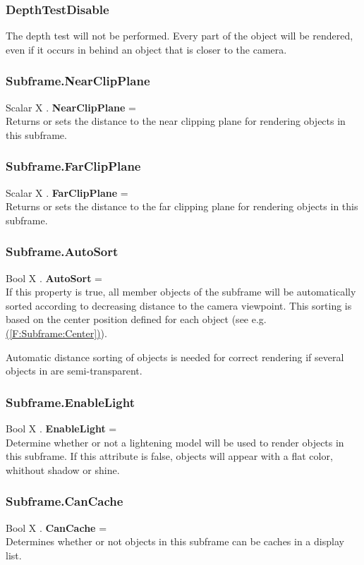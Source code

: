 \documentclass[10pt]{book}
\newcommand{\linkitem}[1]{\hyperref[#1]{\nameref{#1} (\ref{#1})}}
\begin{document}
\subsubsection{DepthTestDisable \label{T:DepthTest|DepthTestDisable}}
The depth test will not be performed. Every part of the object will be rendered, even if it occurs in behind an object that is closer to the camera.

\subsubsection{Subframe.NearClipPlane \label{F:Subframe:NearClipPlane}}
Scalar X . \textbf{NearClipPlane} = \\
Returns or sets the distance to the near clipping plane for rendering objects in this subframe.

\subsubsection{Subframe.FarClipPlane \label{F:Subframe:FarClipPlane}}
Scalar X . \textbf{FarClipPlane} = \\
Returns or sets the distance to the far clipping plane for rendering objects in this subframe.

\subsubsection{Subframe.AutoSort \label{F:Subframe:AutoSort}}
Bool X . \textbf{AutoSort} = \\
If this property is true, all member objects of the subframe will be automatically sorted according to decreasing distance to the camera viewpoint. This sorting is based on the center position defined for each object (see e.g. \linkitem{F:Subframe:Center}).

Automatic distance sorting of objects is needed for correct rendering if several objects in are semi-transparent.

\subsubsection{Subframe.EnableLight \label{F:Subframe:EnableLight}}
Bool X . \textbf{EnableLight} = \\
Determine whether or not a lightening model will be used to render objects in this subframe. If this attribute is false, objects will appear with a flat color, whithout shadow or shine.

\subsubsection{Subframe.CanCache \label{F:Subframe:CanCache}}
Bool X . \textbf{CanCache} = \\
Determines whether or not objects in this subframe can be caches in a display list.
\end{document}
